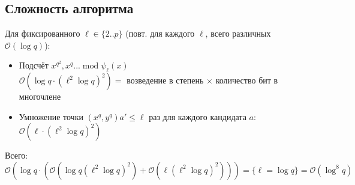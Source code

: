 \documentclass[12pt]{article}
\newcommand{\bigO}{\mathcal{O}}
\theoremstyle{definition}
\theoremstyle{definition}
\theoremstyle{definition}
\begin{document}
\subsection{Сложность алгоритма}

Для фиксированного $\ell\in\{2 .. p\}$ (повт. для каждого $\ell$, всего различных $\bigO(\log q)$):
\begin{itemize}
    \item Подсчёт $x^{q^2}, x^q ... \operatorname{ mod } \psi_\ell(x)$\\
    $\bigO(\log q \cdot (\ell^2 \log q)^2) = $ возведение в степень $\times$ количество бит в многочлене
    
    \item Умножение точки $(x^q, y^q) a' \leq \ell$ раз для каждого кандидата $a:$\\
    $\bigO(\ell\cdot(\ell^2 \log q)^2)$
\end{itemize}
Всего: $\bigO(\log q \cdot(\bigO(\log q (\ell^2 \log q)^2) + \bigO(\ell(\ell^2 \log q)^2))) = \{\ell=\log q\} = \bigO(\log^8 q)$
\end{document}
